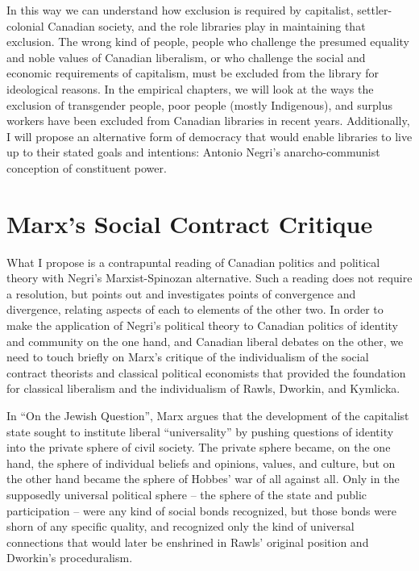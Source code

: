 \documentclass[12pt,oneside]{memoir}
\begin{document}
In this way we can understand how exclusion is required by capitalist, settler-colonial Canadian society, and the role libraries play in maintaining that exclusion. The wrong kind of people, people who challenge the presumed equality and noble values of Canadian liberalism, or who challenge the social and economic requirements of capitalism, must be excluded from the library for ideological reasons. In the empirical chapters, we will look at the ways the exclusion of transgender people, poor people (mostly Indigenous), and surplus workers have been excluded from Canadian libraries in recent years. Additionally, I will propose an alternative form of democracy that would enable libraries to live up to their stated goals and intentions: Antonio Negri's anarcho-communist conception of constituent power.

\section*{Marx's Social Contract Critique}

What I propose is a contrapuntal reading of Canadian politics and political theory with Negri's Marxist-Spinozan alternative. Such a reading does not require a resolution, but points out and investigates points of convergence and divergence, relating aspects of each to elements of the other two. In order to make the application of Negri's political theory to Canadian politics of identity and community on the one hand, and Canadian liberal debates on the other, we need to touch briefly on Marx's critique of the individualism of the social contract theorists and classical political economists that provided the foundation for classical liberalism and the individualism of Rawls, Dworkin, and Kymlicka. 

In ``On the Jewish Question'', Marx argues that the development of the capitalist state sought to institute liberal ``universality'' by pushing questions of identity into the private sphere of civil society. The private sphere became, on the one hand, the sphere of individual beliefs and opinions, values, and culture, but on the other hand became the sphere of Hobbes' war of all against all. Only in the supposedly universal political sphere -- the sphere of the state and public participation -- were any kind of social bonds recognized, but those bonds were shorn of any specific quality, and recognized only the kind of universal connections that would later be enshrined in Rawls' original position and Dworkin's proceduralism.
\end{document}
